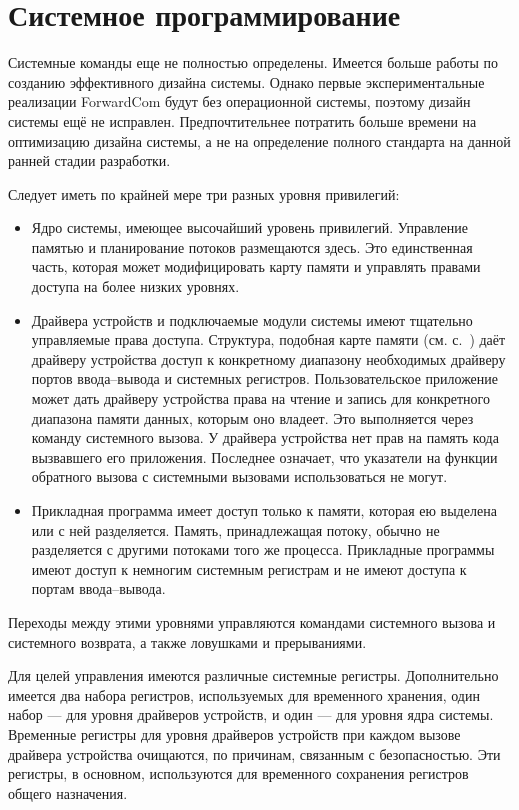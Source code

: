 \documentclass[forwardcom.tex]{subfiles}
\begin{document}
\chapter{Системное программирование}
Системные команды еще не полностью определены. Имеется больше работы по созданию эффективного дизайна системы. Однако первые экспериментальные реализации ForwardCom будут без операционной системы, поэтому дизайн системы ещё не исправлен. Предпочтительнее потратить больше времени на оптимизацию дизайна системы, а не на определение полного стандарта на данной ранней стадии разработки.

Следует иметь по крайней мере три разных уровня привилегий:
\begin{itemize}
\item  Ядро системы, имеющее высочайший уровень привилегий. Управление памятью и планирование потоков размещаются здесь. Это единственная часть, которая может модифицировать карту памяти и управлять правами доступа на более низких уровнях.

\item Драйвера устройств и подключаемые модули системы имеют тщательно управляемые права доступа. Структура, подобная карте памяти (см. с.~\pageref{memoryManagement}) даёт драйверу устройства доступ к конкретному диапазону необходимых драйверу портов ввода--вывода и системных регистров. Пользовательское приложение может дать драйверу устройства права на чтение и запись для конкретного диапазона памяти данных, которым оно владеет. Это выполняется через команду системного вызова. У драйвера устройства нет прав на память кода вызвавшего его приложения. Последнее означает, что указатели на функции обратного вызова с системными вызовами использоваться не могут.

\item Прикладная программа имеет доступ только к памяти, которая ею выделена или с ней разделяется. Память, принадлежащая потоку, обычно не разделяется с другими потоками того же процесса. Прикладные программы имеют доступ к немногим системным регистрам и не имеют доступа к портам ввода--вывода.
\end{itemize}

Переходы между этими уровнями управляются командами системного вызова и системного возврата, а также ловушками и прерываниями.

Для целей управления имеются различные системные регистры. Дополнительно имеется два набора регистров, используемых для временного хранения, один набор --- для уровня драйверов устройств, и один --- для уровня ядра системы. Временные регистры для уровня драйверов устройств при каждом вызове драйвера устройства очищаются, по причинам, связанным с безопасностью. Эти регистры, в основном, используются для временного сохранения регистров общего назначения.
\end{document}
